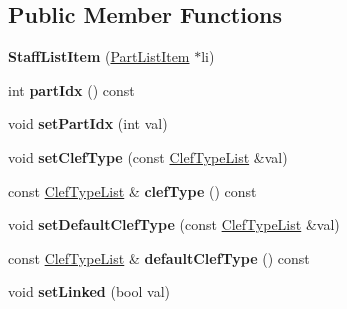 \subsection*{Public Member Functions}
\begin{DoxyCompactItemize}
\item 
\mbox{\label{class_ms_1_1_staff_list_item_aded02c1971db5a03735679484d10b5f9}} 
{\bfseries Staff\+List\+Item} (\hyperlink{class_ms_1_1_part_list_item}{Part\+List\+Item} $\ast$li)
\item 
\mbox{\label{class_ms_1_1_staff_list_item_a0eb041784d86d5d06e8ae83e2dae016a}} 
int {\bfseries part\+Idx} () const
\item 
\mbox{\label{class_ms_1_1_staff_list_item_ae24f10f5ea8ce46d9a347e588694436c}} 
void {\bfseries set\+Part\+Idx} (int val)
\item 
\mbox{\label{class_ms_1_1_staff_list_item_ad96de888a9d0e8abd49d5ee262b03b6a}} 
void {\bfseries set\+Clef\+Type} (const \hyperlink{struct_ms_1_1_clef_type_list}{Clef\+Type\+List} \&val)
\item 
\mbox{\label{class_ms_1_1_staff_list_item_a05a8ab96dff3c7868f625cf0f07ac655}} 
const \hyperlink{struct_ms_1_1_clef_type_list}{Clef\+Type\+List} \& {\bfseries clef\+Type} () const
\item 
\mbox{\label{class_ms_1_1_staff_list_item_a9f9826d265ff4976f532e5eeed195872}} 
void {\bfseries set\+Default\+Clef\+Type} (const \hyperlink{struct_ms_1_1_clef_type_list}{Clef\+Type\+List} \&val)
\item 
\mbox{\label{class_ms_1_1_staff_list_item_abbcf29af9581d41ce5dc85201c2bb8d3}} 
const \hyperlink{struct_ms_1_1_clef_type_list}{Clef\+Type\+List} \& {\bfseries default\+Clef\+Type} () const
\item 
\mbox{\label{class_ms_1_1_staff_list_item_aa154ba535537489845c0ac6ccc779cbb}} 
void {\bfseries set\+Linked} (bool val)
\item 
\mbox{\label{class_ms_1_1_staff_list_item_ab3887498eb137cef29f112f7e1834eac}} 

\end{DoxyCompactItemize}
